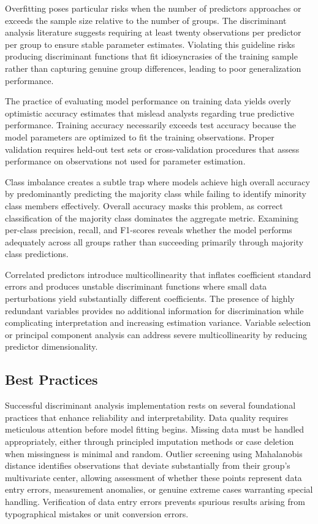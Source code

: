 \documentclass[
]{article}
\begin{document}
Overfitting poses particular risks when the number of predictors
approaches or exceeds the sample size relative to the number of groups.
The discriminant analysis literature suggests requiring at least twenty
observations per predictor per group to ensure stable parameter
estimates. Violating this guideline risks producing discriminant
functions that fit idiosyncrasies of the training sample rather than
capturing genuine group differences, leading to poor generalization
performance.

The practice of evaluating model performance on training data yields
overly optimistic accuracy estimates that mislead analysts regarding
true predictive performance. Training accuracy necessarily exceeds test
accuracy because the model parameters are optimized to fit the training
observations. Proper validation requires held-out test sets or
cross-validation procedures that assess performance on observations not
used for parameter estimation.

Class imbalance creates a subtle trap where models achieve high overall
accuracy by predominantly predicting the majority class while failing to
identify minority class members effectively. Overall accuracy masks this
problem, as correct classification of the majority class dominates the
aggregate metric. Examining per-class precision, recall, and F1-scores
reveals whether the model performs adequately across all groups rather
than succeeding primarily through majority class predictions.

Correlated predictors introduce multicollinearity that inflates
coefficient standard errors and produces unstable discriminant functions
where small data perturbations yield substantially different
coefficients. The presence of highly redundant variables provides no
additional information for discrimination while complicating
interpretation and increasing estimation variance. Variable selection or
principal component analysis can address severe multicollinearity by
reducing predictor dimensionality.

\subsection{Best Practices}

Successful discriminant analysis implementation rests on several
foundational practices that enhance reliability and interpretability.
Data quality requires meticulous attention before model fitting begins.
Missing data must be handled appropriately, either through principled
imputation methods or case deletion when missingness is minimal and
random. Outlier screening using Mahalanobis distance identifies
observations that deviate substantially from their group's multivariate
center, allowing assessment of whether these points represent data entry
errors, measurement anomalies, or genuine extreme cases warranting
special handling. Verification of data entry errors prevents spurious
results arising from typographical mistakes or unit conversion errors.
\end{document}
